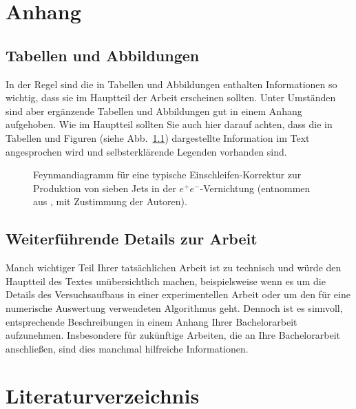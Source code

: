 \documentclass[a4paper,11pt,oneside,final,german,openbib,pdftex]{scrbook}
\begin{document}
\begin{appendix}
\chapter{Anhang}

\section{Tabellen und Abbildungen}

In der Regel sind die in Tabellen und Abbildungen enthalten Informationen 
so wichtig, dass sie im Hauptteil der Arbeit erscheinen sollten. Unter 
Umst\"anden sind aber erg\"anzende Tabellen und Abbildungen gut in einem 
Anhang aufgehoben. Wie im Hauptteil sollten Sie auch hier darauf achten, 
dass die in Tabellen und Figuren (siehe Abb.\ \ref{Abb:1}) dargestellte 
Information im Text angesprochen wird und selbsterkl\"arende Legenden 
vorhanden sind.
\medskip

\begin{figure}[h]
\begin{center}
\end{center}
\caption{\label{Abb:1}
Feynmandiagramm f\"ur eine typische Einschleifen-Korrektur zur 
Produktion von sieben Jets in der $e^+e^-$-Vernichtung (entnommen 
aus \cite{thepnews}, mit Zustimmung der Autoren).
} 
\end{figure}


\section{Weiterf\"uhrende Details zur Arbeit}

Manch wichtiger Teil Ihrer tats\"achlichen Arbeit ist zu technisch 
und w\"urde den Hauptteil des Textes un\"ubersichtlich machen, 
beispielsweise wenn es um die Details des Versuchsaufbaus in einer 
experimentellen Arbeit oder um den f\"ur eine numerische Auswertung 
verwendeten Algorithmus geht. Dennoch ist es sinnvoll, entsprechende 
Beschreibungen in einem Anhang Ihrer Bachelorarbeit aufzunehmen. 
Insbesondere f\"ur zuk\"unftige Arbeiten, die an Ihre Bachelorarbeit 
anschlie{\ss}en, sind dies manchmal hilfreiche Informationen.

\chapter{Literaturverzeichnis}


\end{appendix}
\end{document}
